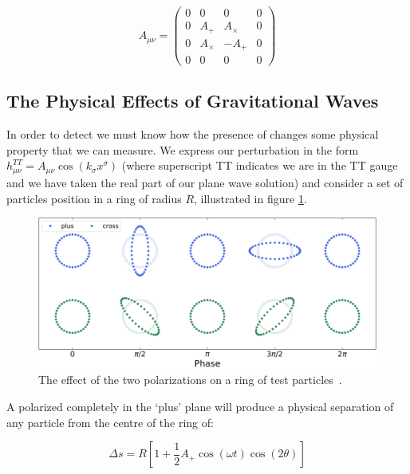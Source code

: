 \begin{equation}
   A_{\mu \nu} =
   \begin{pmatrix}
      0 & 0 & 0 & 0 \\
      0 & A_+ & A_\times & 0 \\
      0 & A_\times & -A_+ & 0 \\
      0 & 0 & 0 & 0
   \end{pmatrix}
   \label{eqn:A_mu_nu}
\end{equation}

\subsection{\label{sec:Mechanics}The Physical Effects of Gravitational Waves}

In order to detect \gws we must know how the presence of \gws changes some physical property that we can measure. We express our perturbation in the form $h_{\mu \nu}^{TT} = A_{\mu \nu} \cos(k_\sigma x^\sigma)$ (where superscript TT
indicates we are in the TT gauge and we have taken the real part of our plane wave solution) and consider a set of particles position in a ring of radius $R$, illustrated in figure \ref{fig:polarization}.

\begin{figure}
   \includegraphics[width=\textwidth]{images/gr_gw/polarization.png}
   \caption{\label{fig:polarization}The effect of the two polarizations on a ring of test particles~\cite{gw_polarization_plots}.}
\end{figure}

A \gw polarized completely in the `plus' plane will produce a physical separation of any particle from the centre of the ring of:

\begin{equation}
   \Delta s = R[1 + \frac{1}{2} A_+ \cos(\omega t) \cos(2 \theta)]
   \label{eqn:plus_separation}
\end{equation}

